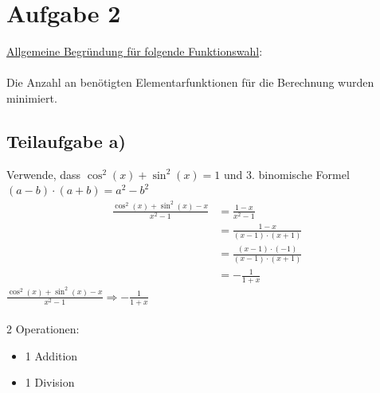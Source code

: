\documentclass{llncs}
\begin{document}
\section*{Aufgabe 2}

\underline{Allgemeine Begründung für folgende Funktionswahl}:\\
\\
Die Anzahl an benötigten Elementarfunktionen für die Berechnung wurden minimiert.

\subsection*{Teilaufgabe a)}
Verwende, dass $\cos^2(x)+\sin^2(x)=1$ und 3. binomische Formel $(a-b)\cdot(a+b)=a^2-b^2$\\
\begin{align*}
\frac{\cos^2(x)+\sin^2(x)-x}{x^2-1}
&=\frac{1-x}{x^2-1}\\
&=\frac{1-x}{(x-1)\cdot (x+1)}\\
&=\frac{(x-1)\cdot(-1)}{(x-1)\cdot (x+1)}\\
&=- \frac{1}{1+x}
\end{align*}
$\frac{\cos^2(x)+\sin^2(x)-x}{x^2-1}\Rightarrow - \frac{1}{1+x}$\\
\\
2 Operationen:
\begin{itemize}
\item 1 Addition
\item 1 Division
\end{itemize}
\end{document}
